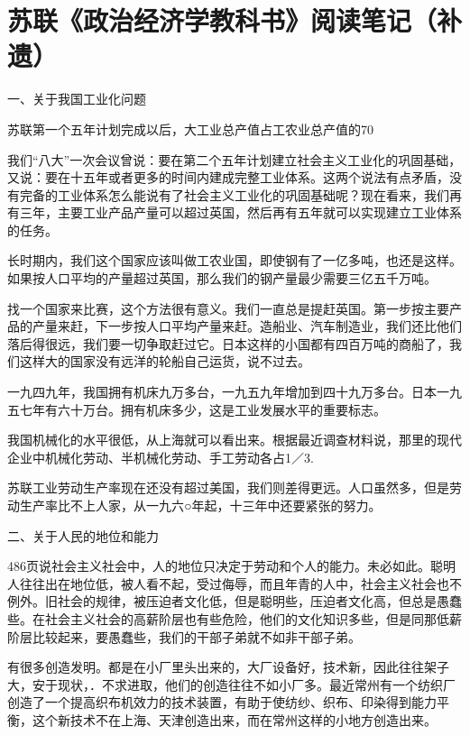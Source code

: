 \section[苏联《政治经济学教科书》阅读笔记（补遗）]{苏联《政治经济学教科书》阅读笔记（补遗）}


一、关于我国工业化问题

苏联第一个五年计划完成以后，大工业总产值占工农业总产值的70%

我们“八大”一次会议曾说：要在第二个五年计划建立社会主义工业化的巩固基础，又说：要在十五年或者更多的时间内建成完整工业体系。这两个说法有点矛盾，没有完备的工业体系怎么能说有了社会主义工业化的巩固基础呢？现在看来，我们再有三年，主要工业产品产量可以超过英国，然后再有五年就可以实现建立工业体系的任务。

长时期内，我们这个国家应该叫做工农业国，即使钢有了一亿多吨，也还是这样。如果按人口平均的产量超过英国，那么我们的钢产量最少需要三亿五千万吨。

找一个国家来比赛，这个方法很有意义。我们一直总是提赶英国。第一步按主要产品的产量来赶，下一步按人口平均产量来赶。造船业、汽车制造业，我们还比他们落后得很远，我们要一切争取赶过它。日本这样的小国都有四百万吨的商船了，我们这样大的国家没有远洋的轮船自己运货，说不过去。

一九四九年，我国拥有机床九万多台，一九五九年增加到四十九万多台。日本一九五七年有六十万台。拥有机床多少，这是工业发展水平的重要标志。

我国机械化的水平很低，从上海就可以看出来。根据最近调查材料说，那里的现代企业中机械化劳动、半机械化劳动、手工劳动各占1／3.

苏联工业劳动生产率现在还没有超过美国，我们则差得更远。人口虽然多，但是劳动生产率比不上人家，从一九六○年起，十三年中还要紧张的努力。

二、关于人民的地位和能力

486页说社会主义社会中，人的地位只决定于劳动和个人的能力。未必如此。聪明人往往出在地位低，被人看不起，受过侮辱，而且年青的人中，社会主义社会也不例外。旧社会的规律，被压迫者文化低，但是聪明些，压迫者文化高，但总是愚蠢些。在社会主义社会的高薪阶层也有些危险，他们的文化知识多些，但是同那低薪阶层比较起来，要愚蠢些，我们的干部子弟就不如非干部子弟。

有很多创造发明。都是在小厂里头出来的，大厂设备好，技术新，因此往往架子大，安于现状，．不求进取，他们的创造往往不如小厂多。最近常州有一个纺织厂创造了一个提高织布机效力的技术装置，有助于使纺纱、织布、印染得到能力平衡，这个新技术不在上海、天津创造出来，而在常州这样的小地方创造出来。

